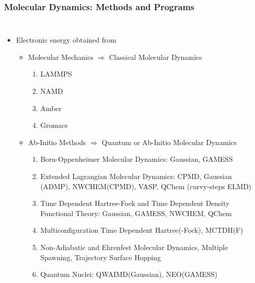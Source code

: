 \documentclass[slidestop,mathserif,compress,xcolor=svgnames]{beamer}
\begin{document}
\begin{frame}
  \frametitle{\small Molecular Dynamics: Methods and Programs}
  \begin{columns}
    \column{12cm}
    \begin{itemize}
    \item Electronic energy obtained from 
      \begin{itemize}
      \item {Molecular Mechanics $\Rightarrow$ Classical Molecular Dynamics}
        \begin{enumerate}
        \item LAMMPS
        \item NAMD
        \item Amber
        \item Gromacs
        \end{enumerate}
      \item {Ab-Initio Methods $\Rightarrow$ Quantum or Ab-Initio Molecular Dynamics}
        \begin{enumerate}
        \item Born-Oppenheimer Molecular Dynamics: Gaussian, GAMESS
        \item Extended Lagrangian Molecular Dynamics: CPMD, Gaussian (ADMP), NWCHEM(CPMD), {\color{red}VASP}, {\color{red}QChem (curvy-steps ELMD)}
        \item Time Dependent Hartree-Fock and Time Dependent Density Functional Theory: Gaussian, GAMESS, NWCHEM, {\color{red}QChem}
        \item {\color{red}Multiconfiguration Time Dependent Hartree(-Fock), MCTDH(F)}
        \item {\color{red}Non-Adiabatic and  Ehrenfest Molecular Dynamics, Multiple Spawning, Trajectory Surface Hopping}
        \item {\color{red}Quantum Nuclei: QWAIMD(Gaussian), NEO(GAMESS)}
        \end{enumerate}
      \end{itemize}
    \end{itemize}
  \end{columns}
\end{frame}
\end{document}
